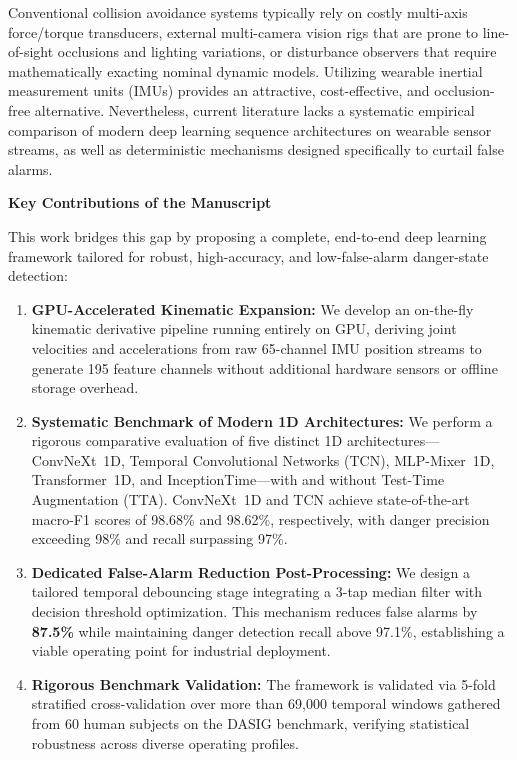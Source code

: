 \documentclass[11pt,a4paper]{article}
\begin{document}
Conventional collision avoidance systems typically rely on costly multi-axis force/torque transducers, external multi-camera vision rigs that are prone to line-of-sight occlusions and lighting variations, or disturbance observers that require mathematically exacting nominal dynamic models. Utilizing wearable inertial measurement units (IMUs) provides an attractive, cost-effective, and occlusion-free alternative. Nevertheless, current literature lacks a systematic empirical comparison of modern deep learning sequence architectures on wearable sensor streams, as well as deterministic mechanisms designed specifically to curtail false alarms.

\vspace{0.3em}
{\large\textbf{Key Contributions of the Manuscript}}\par\vspace{2pt}
This work bridges this gap by proposing a complete, end-to-end deep learning framework tailored for robust, high-accuracy, and low-false-alarm danger-state detection:
\begin{enumerate}[leftmargin=*,itemsep=1.5pt,topsep=1.5pt,partopsep=0pt]
    \item \textbf{GPU-Accelerated Kinematic Expansion:} We develop an on-the-fly kinematic derivative pipeline running entirely on GPU, deriving joint velocities and accelerations from raw 65-channel IMU position streams to generate 195 feature channels without additional hardware sensors or offline storage overhead.
    \item \textbf{Systematic Benchmark of Modern 1D Architectures:} We perform a rigorous comparative evaluation of five distinct 1D architectures—ConvNeXt~1D, Temporal Convolutional Networks (TCN), MLP-Mixer~1D, Transformer~1D, and InceptionTime—with and without Test-Time Augmentation (TTA). ConvNeXt~1D and TCN achieve state-of-the-art macro-F1 scores of 98.68\% and 98.62\%, respectively, with danger precision exceeding 98\% and recall surpassing 97\%.
    \item \textbf{Dedicated False-Alarm Reduction Post-Processing:} We design a tailored temporal debouncing stage integrating a 3-tap median filter with decision threshold optimization. This mechanism reduces false alarms by \textbf{87.5\%} while maintaining danger detection recall above 97.1\%, establishing a viable operating point for industrial deployment.
    \item \textbf{Rigorous Benchmark Validation:} The framework is validated via 5-fold stratified cross-validation over more than 69,000 temporal windows gathered from 60 human subjects on the DASIG benchmark, verifying statistical robustness across diverse operating profiles.
\end{enumerate}
\end{document}
